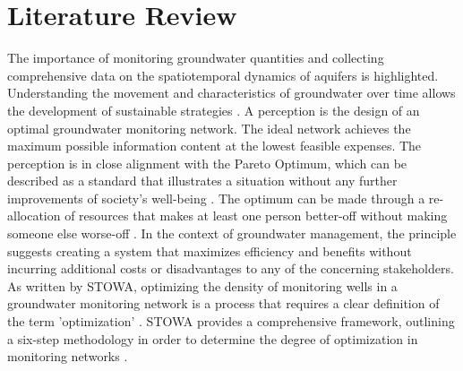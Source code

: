 \chapter{Literature Review}
\label{chapter:Literature Review}

The importance of monitoring groundwater quantities and collecting comprehensive data on the spatiotemporal dynamics of aquifers is highlighted. Understanding the movement and characteristics of groundwater over time allows the development of sustainable strategies \cite{ohmer-2019}. A perception is the design of an optimal groundwater monitoring network. The ideal network achieves the maximum possible information content at the lowest feasible expenses. The perception is in close alignment with the Pareto Optimum, which can be described as a standard that illustrates a situation without any further improvements of society's well-being \cite{smith-2013}. The optimum can be made through a re-allocation of resources that makes at least one person better-off without making someone else worse-off \cite{smith-2013}.  In the context of groundwater management, the principle suggests creating a system that maximizes efficiency and benefits without incurring additional costs or disadvantages to any of the concerning stakeholders. As written by STOWA, optimizing the density of monitoring wells in a groundwater monitoring network is a process that requires a clear definition of the term 'optimization' \cite{stowa-1998}. STOWA provides a comprehensive framework, outlining a six-step methodology in order to determine the degree of optimization in monitoring networks \cite{stowa-1998}.

